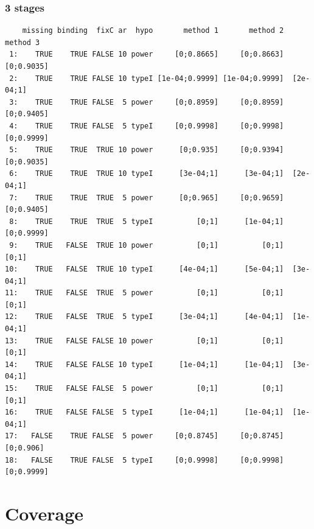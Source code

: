 \documentclass[12pt]{article}
\begin{document}
\subsubsection{3 stages}
\label{sec:orgd300419}
\begin{verbatim}
    missing binding  fixC ar  hypo       method 1       method 2   method 3
 1:    TRUE    TRUE FALSE 10 power     [0;0.8665]     [0;0.8663] [0;0.9035]
 2:    TRUE    TRUE FALSE 10 typeI [1e-04;0.9999] [1e-04;0.9999]  [2e-04;1]
 3:    TRUE    TRUE FALSE  5 power     [0;0.8959]     [0;0.8959] [0;0.9405]
 4:    TRUE    TRUE FALSE  5 typeI     [0;0.9998]     [0;0.9998] [0;0.9999]
 5:    TRUE    TRUE  TRUE 10 power      [0;0.935]     [0;0.9394] [0;0.9035]
 6:    TRUE    TRUE  TRUE 10 typeI      [3e-04;1]      [3e-04;1]  [2e-04;1]
 7:    TRUE    TRUE  TRUE  5 power      [0;0.965]     [0;0.9659] [0;0.9405]
 8:    TRUE    TRUE  TRUE  5 typeI          [0;1]      [1e-04;1] [0;0.9999]
 9:    TRUE   FALSE  TRUE 10 power          [0;1]          [0;1]      [0;1]
10:    TRUE   FALSE  TRUE 10 typeI      [4e-04;1]      [5e-04;1]  [3e-04;1]
11:    TRUE   FALSE  TRUE  5 power          [0;1]          [0;1]      [0;1]
12:    TRUE   FALSE  TRUE  5 typeI      [3e-04;1]      [4e-04;1]  [1e-04;1]
13:    TRUE   FALSE FALSE 10 power          [0;1]          [0;1]      [0;1]
14:    TRUE   FALSE FALSE 10 typeI      [1e-04;1]      [1e-04;1]  [3e-04;1]
15:    TRUE   FALSE FALSE  5 power          [0;1]          [0;1]      [0;1]
16:    TRUE   FALSE FALSE  5 typeI      [1e-04;1]      [1e-04;1]  [1e-04;1]
17:   FALSE    TRUE FALSE  5 power     [0;0.8745]     [0;0.8745]  [0;0.906]
18:   FALSE    TRUE FALSE  5 typeI     [0;0.9998]     [0;0.9998] [0;0.9999]
\end{verbatim}

\clearpage 

\section{Coverage}
\label{sec:orgcef8f64}
\end{document}
